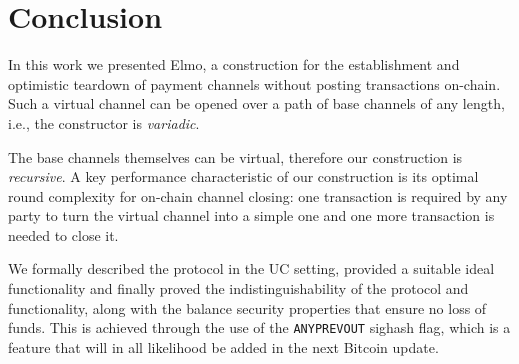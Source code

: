 \section{Conclusion}

  In this work we presented Elmo, a
  construction for the establishment and optimistic teardown of
  payment channels without posting transactions on-chain.
  Such a virtual channel can be opened over a path of base channels of
  any length, i.e., the constructor is \emph{variadic}.

  The base channels themselves can be virtual, therefore our construction is
  \emph{recursive}. A key performance characteristic of our
  construction is its optimal round complexity for on-chain channel
  closing: one transaction is required by any party to turn the
  virtual channel into a simple one and one more transaction is needed to close
  it.

  We formally described the protocol in the UC setting, provided a suitable
  ideal functionality and finally proved the indistinguishability
  of the protocol and functionality, along with the balance security properties
  that ensure no loss of funds. This is
  achieved through the use of the \texttt{ANYPREVOUT} sighash flag, which is a
  feature that will in all likelihood be added in the next Bitcoin update.
